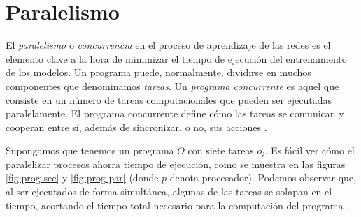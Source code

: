 
\chapter{Paralelismo}\label{chap:paralel}

El \textit{paralelismo} o \textit{concurrencia} en el proceso de aprendizaje de las redes es el elemento clave a la
hora de minimizar el tiempo de ejecución del entrenamiento de los modelos. Un programa puede, normalmente, dividirse
en muchos componentes que denominamos \textit{tareas}. Un \textit{programa concurrente} es aquel que consiste en un
número de tareas computacionales que pueden ser ejecutadas paralelamente. El programa concurrente define cómo las 
tareas se comunican y cooperan entre sí, además de sincronizar, o no, sus acciones \cite{czech_2017}. 

\vspace{10pt}
Supongamos que tenemos un programa $O$ con siete tareas $o_i$. Es fácil ver cómo el paralelizar procesos ahorra tiempo
de ejecución, como se muestra en las figuras \ref{fig:prog-sec} y \ref{fig:prog-par} (donde $p$ denota procesador).
Podemos observar que, al ser ejecutados de forma simultánea, algunas de las tareas se solapan en el tiempo, acortando 
el tiempo total necesario para la computación del programa \cite{czech_2017}.

